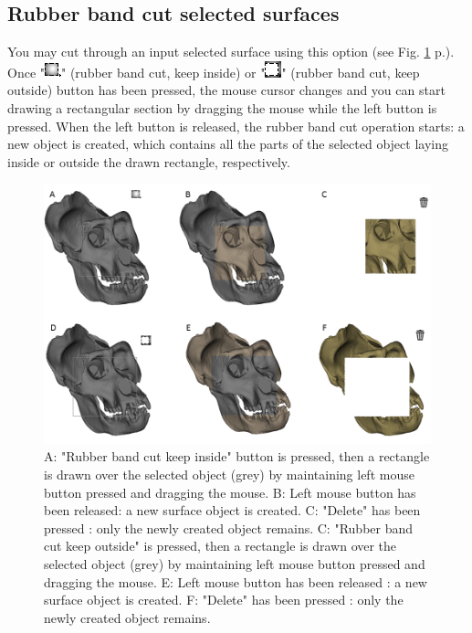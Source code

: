 \subsection{Rubber band cut selected surfaces} \label{rubber_band_cut_section}

You may cut through an input selected surface using this option (see Fig. \ref{rubber_band_cut} p.\pageref{rubber_band_cut}). Once "\includegraphics[scale=0.7]{images/06/objects/rubber_mode_keepinside.png}" (rubber band cut, keep inside) or "\includegraphics[scale=0.7]{images/06/objects/rubber_mode_keepoutside.png}" (rubber band cut, keep outside) button has been pressed, the mouse cursor changes and you can start drawing a rectangular section by dragging the mouse while the left button is pressed. When the left button is released, the rubber band cut operation starts: a new object is created, which contains all the parts of the selected object laying inside or outside the drawn rectangle, respectively.\\

\begin{figure}
  \centering
  \includegraphics[scale=0.6]{images/06/objects/rubber_band_cut.png} 
	\caption{A: "Rubber band cut keep inside" button is pressed, then a rectangle is drawn over the selected object (grey) by maintaining left mouse button pressed and dragging the mouse. B: Left mouse button has been released: a new surface object is  created. C: "Delete" has been pressed : only the newly created  object remains. C: "Rubber band cut keep outside" is pressed, then a rectangle is drawn over the selected object (grey) by maintaining left mouse button pressed and dragging the mouse. E: Left mouse button has been released : a new surface object is  created. F: "Delete" has been pressed : only the newly created  object remains. }
\label{rubber_band_cut}
 
\end{figure}

